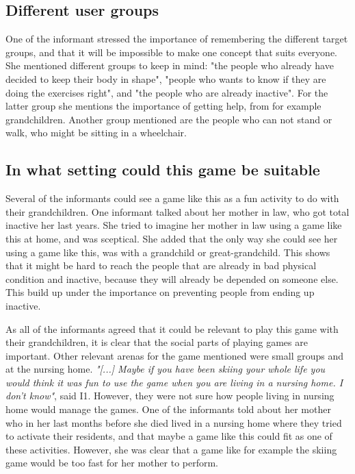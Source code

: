 \subsection{Different user groups}
One of the informant stressed the importance of remembering the different target groups, and that it will be impossible to make one concept that suits everyone. She mentioned different groups to keep in mind: "the people who already have decided to keep their body in shape", "people who wants to know if they are doing the exercises right", and "the people who are already inactive". For the latter group she mentions the importance of getting help, from for example grandchildren.  Another group mentioned are the people who can not stand or walk, who might be sitting in a wheelchair.

\subsection{In what setting could this game be suitable}
Several of the informants could see a game like this as a fun activity to do with their grandchildren. One informant talked about her mother in law, who got total inactive her last years. She tried to imagine her mother in law using a game like this at home, and was sceptical. She added that the only way she could see her using a game like this, was with a grandchild or great-grandchild. This shows that it might be hard to reach the people that are already in bad physical condition and inactive, because they will already be depended on someone else. This build up under the importance on preventing people from ending up inactive.

As all of the informants agreed that it could be relevant to play this game with their grandchildren, it is clear that the social parts of playing games are important. Other relevant arenas for the game mentioned were small groups and at the nursing home. \emph{"[...] Maybe if you have been skiing your whole life you would think it was fun to use the game when you are living in a nursing home. I don't know"}, said I1. However, they were not sure how people living in nursing home would manage the games. One of the informants told about her mother who in her last months before she died lived in a nursing home where they tried to activate their residents, and that maybe a game like this could fit as one of these activities. However, she was clear that a  game like for example the skiing game would be too fast for her mother to perform. 

